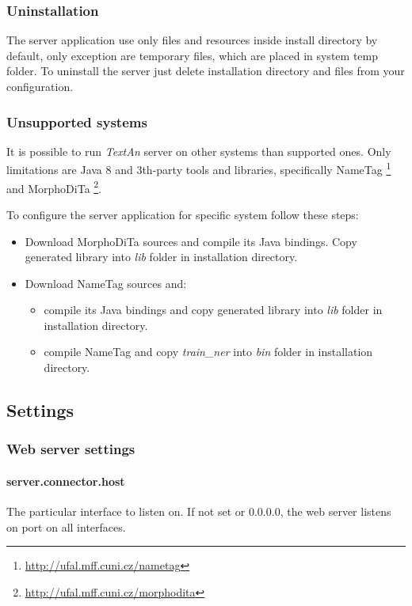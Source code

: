 \documentclass[12pt,a4paper]{report}
\newcommand{\textan}{\emph{TextAn}}
\begin{document}
\subsubsection{Uninstallation}
The server application use only files and resources inside install directory by
default, only exception are temporary files, which are placed in system temp folder.
To uninstall the server just delete installation directory and files from your
configuration.

\subsubsection{Unsupported systems}
\label{sssec:unsupport}
It is possible to run \textan{} server on other systems than supported ones. Only
limitations are Java 8 and 3th-party tools and libraries, specifically NameTag%
\footnote{\url{http://ufal.mff.cuni.cz/nametag}} and MorphoDiTa%
\footnote{\url{http://ufal.mff.cuni.cz/morphodita}}.

To configure the server application for specific system follow these steps:
\begin{itemize}
\item Download MorphoDiTa sources and compile its Java bindings. Copy generated
library into \emph{lib} folder in installation directory.
\item Download NameTag sources and:
	\begin{itemize}
	\item compile its Java bindings and copy generated library into \emph{lib}
	folder in installation directory.
	\item compile NameTag and copy \emph{train\_ner} into \emph{bin} folder in
	installation directory.
	\end{itemize}
\end{itemize}

\subsection{Settings}
\label{sec:ServerSettings}

\subsubsection{Web server settings}
\label{sssec:WebServerSettings}

\paragraph{server.connector.host}
The particular interface to listen on. If not set or 0.0.0.0, the web server
listens on port on all interfaces.
\end{document}
